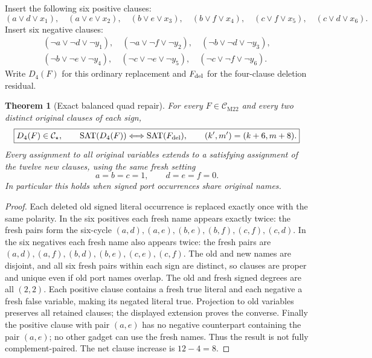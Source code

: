 \documentclass[11pt]{article}
\newtheorem{theorem}{Theorem}
\newcommand{\CM}{\mathcal C_{\mathrm{M22}}}
\newcommand{\CS}{\mathcal C_\star}
\begin{document}
Insert the following six positive clauses:
\[
 (a\vee d\vee x_1),\quad(a\vee e\vee x_2),\quad
 (b\vee e\vee x_3),\quad(b\vee f\vee x_4),\quad
 (c\vee f\vee x_5),\quad(c\vee d\vee x_6).
\tag{1}
\]
Insert six negative clauses:
\[
\begin{split}
(\neg a\vee\neg d\vee\neg y_1),\quad
(\neg a\vee\neg f\vee\neg y_2),\quad
(\neg b\vee\neg d\vee\neg y_3),\\
(\neg b\vee\neg e\vee\neg y_4),\quad
(\neg c\vee\neg e\vee\neg y_5),\quad
(\neg c\vee\neg f\vee\neg y_6).
\end{split}\tag{2}
\]
Write \(D_4(F)\) for this ordinary replacement and \(F_{\rm del}\) for the four-clause deletion residual.

\begin{theorem}[Exact balanced quad repair]
For every \(F\in\CM\) and every two distinct original clauses of each sign,
\[
\boxed{D_4(F)\in\CS,\qquad
 \operatorname{SAT}(D_4(F))\Longleftrightarrow
 \operatorname{SAT}(F_{\rm del}),\qquad
 (k',m')=(k+6,m+8).}
\]
Every assignment to \emph{all} original variables extends to a satisfying assignment of the \emph{twelve new clauses}, using the same fresh setting
\[
 a=b=c=1,\qquad d=e=f=0.
\]
In particular this holds when signed port occurrences share original names.
\end{theorem}
\begin{proof}
Each deleted old signed literal occurrence is replaced exactly once with the same polarity. In the six positives each fresh name appears exactly twice: the fresh pairs form the six-cycle
\((a,d),(a,e),(b,e),(b,f),(c,f),(c,d)\).
In the six negatives each fresh name also appears twice: the fresh pairs are
\((a,d),(a,f),(b,d),(b,e),(c,e),(c,f)\).
The old and new names are disjoint, and all six fresh pairs within each sign are distinct, so clauses are proper and unique even if old port names overlap. The old and fresh signed degrees are all \((2,2)\). Each positive clause contains a fresh true literal and each negative a fresh false variable, making its negated literal true. Projection to old variables preserves all retained clauses; the displayed extension proves the converse. Finally the positive clause with pair \((a,e)\) has no negative counterpart containing the pair \((a,e)\); no other gadget can use the fresh names. Thus the result is not fully complement-paired. The net clause increase is \(12-4=8\).
\end{proof}
\end{document}
